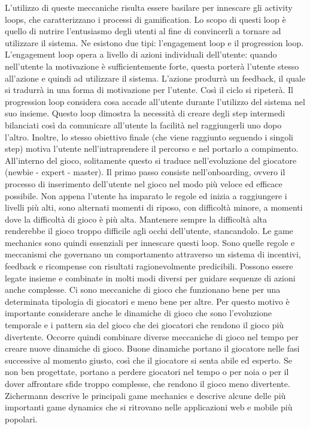 
L'utilizzo di queste meccaniche risulta essere basilare per innescare gli activity loops, che caratterizzano i processi di gamification.
Lo scopo di questi loop è quello di nutrire l'entusiasmo degli utenti al fine di convincerli a tornare ad utilizzare il sistema. Ne esistono due tipi: l'engagement loop e il progression loop.
L'engagement loop opera a livello di azioni individuali dell'utente: quando nell'utente la motivazione è sufficientemente forte, questa porterà l'utente stesso all'azione e quindi ad utilizzare il sistema. L'azione produrrà un feedback, il quale si tradurrà in una forma di motivazione per l'utente. Così il ciclo si ripeterà.
Il progression loop considera cosa accade all'utente durante l'utilizzo del sistema nel suo insieme. Questo loop dimostra la necessità di creare degli step intermedi bilanciati così da comunicare all'utente la facilità nel raggiungerli uno dopo l'altro. Inoltre, lo stesso obiettivo finale (che viene raggiunto seguendo i singoli step) motiva l'utente nell'intraprendere il percorso e nel portarlo a compimento.
All'interno del gioco, solitamente questo si traduce nell'evoluzione del giocatore (newbie - expert - master). Il primo passo consiste nell'onboarding, ovvero il processo di inserimento dell'utente nel gioco nel modo più veloce ed efficace possibile. Non appena l'utente ha imparato le regole ed inizia a raggiungere i livelli più alti, sono alternati momenti di riposo, con difficoltà minore, a momenti dove la difficoltà di gioco è più alta. Mantenere sempre la difficoltà alta renderebbe il gioco troppo difficile agli occhi dell'utente, stancandolo.
Le game mechanics sono quindi essenziali per innescare questi loop. Sono quelle regole e meccanismi che governano un comportamento attraverso un sistema di incentivi, feedback e ricompense con risultati ragionevolmente predicibili. Possono essere legate insieme e combinate in molti modi diversi per guidare sequenze di azioni anche complesse.
Ci sono meccaniche di gioco che funzionano bene per una determinata tipologia di giocatori e meno bene per altre. Per questo motivo è importante considerare anche le dinamiche di gioco
che sono l'evoluzione temporale e i pattern sia del gioco che dei giocatori che rendono il gioco più divertente. Occorre quindi combinare diverse meccaniche di gioco nel tempo
per creare nuove dinamiche di gioco. Buone dinamiche portano il giocatore nelle fasi successive al momento giusto, così che il giocatore si senta abile ed esperto. Se non ben progettate, portano a perdere giocatori nel tempo o per noia o per il dover affrontare sfide troppo complesse, che rendono il gioco meno divertente.
Zichermann descrive le principali game mechanics e descrive alcune delle più importanti game dynamics che si ritrovano nelle applicazioni web e mobile più popolari.

